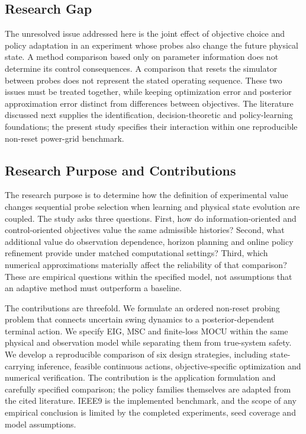 \documentclass[journal]{IEEEtran}
\begin{document}
\subsection{Research Gap}
The unresolved issue addressed here is the joint effect of objective choice
and policy adaptation in an experiment whose probes also change the future
physical state. A method comparison based only on parameter information does
not determine its control consequences. A comparison that resets the simulator
between probes does not represent the stated operating sequence. These two
issues must be treated together, while keeping optimization error and
posterior approximation error distinct from differences between objectives.
The literature discussed next supplies the identification, decision-theoretic
and policy-learning foundations; the present study specifies their interaction
within one reproducible non-reset power-grid benchmark.

\subsection{Research Purpose and Contributions}
The research purpose is to determine how the definition of experimental value
changes sequential probe selection when learning and physical state evolution
are coupled. The study asks three questions. First, how do information-oriented
and control-oriented objectives value the same admissible histories? Second,
what additional value do observation dependence, horizon planning and online
policy refinement provide under matched computational settings? Third, which
numerical approximations materially affect the reliability of that comparison?
These are empirical questions within the specified model, not assumptions
that an adaptive method must outperform a baseline.

The contributions are threefold. We formulate an ordered non-reset probing
problem that connects uncertain swing dynamics to a posterior-dependent
terminal action. We specify EIG, MSC and finite-loss MOCU within the same
physical and observation model while separating them from true-system safety.
We develop a reproducible comparison of six design strategies, including
state-carrying inference, feasible continuous actions, objective-specific
optimization and numerical verification. The contribution is the application
formulation and carefully specified comparison; the policy families themselves
are adapted from the cited literature. IEEE9 is the implemented benchmark,
and the scope of any empirical conclusion is limited by the completed
experiments, seed coverage and model assumptions.
\end{document}
